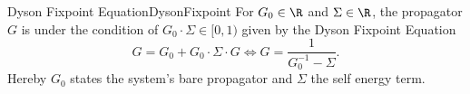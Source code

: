 \begin{mdef}{Dyson Fixpoint Equation}{DysonFixpoint}
    For $G_0\in\R$ and $\Sigma\in\R$, the propagator $G$ is under the condition of $G_0\cdot\Sigma\in[0,1)$ given by the Dyson Fixpoint Equation
    \[
        G = G_0 + G_0\cdot\Sigma\cdot G \iff G = \frac{1}{G_0^{-1} - \Sigma}.
    \]
    Hereby $G_0$ states the system's bare propagator and $\Sigma$ the self energy term. 
\end{mdef}